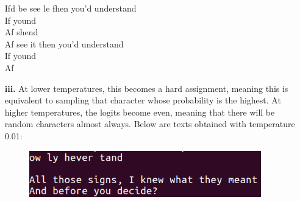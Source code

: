 \documentclass{article}
\begin{document}
\begin{flushleft}
\begin{itemize}
{\begin{minipage}{0.45\linewidth}
Ifd be see le fhen you'd understand\\

If yound\\
Af shend\\
Af see it then you'd understand\\

If yound\\
Af
\end{minipage}
}
\item [\textbf{iii.}] At lower temperatures, this becomes a hard assignment, meaning this is equivalent to sampling that character whose probability is the highest. At higher temperatures, the logits become even, meaning that there will be random characters almost always.
Below are texts obtained with temperature 0.01:
\begin{figure}[H]
\begin{minipage}{0.3\textwidth}
\centering
\includegraphics[width=0.95\textwidth]{100(1)-0_01.png}
\end{minipage}

\end{figure}
\end{itemize}
\end{flushleft}
\end{document}
